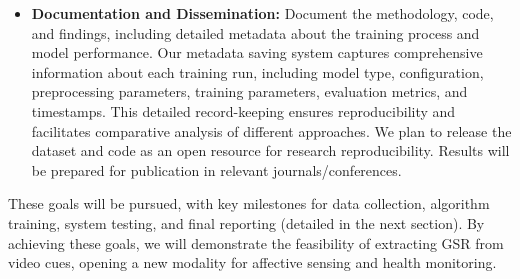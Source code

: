 \begin{itemize}
        \item \textbf{Documentation and Dissemination:} Document the methodology, code, and findings, including detailed metadata about the training process and model performance. Our metadata saving system captures comprehensive information about each training run, including model type, configuration, preprocessing parameters, training parameters, evaluation metrics, and timestamps. This detailed record-keeping ensures reproducibility and facilitates comparative analysis of different approaches. We plan to release the dataset and code as an open resource for research reproducibility. Results will be prepared for publication in relevant journals/conferences.
    \end{itemize}

    These goals will be pursued, with key milestones for data collection, algorithm training, system testing, and final reporting (detailed in the next section). By achieving these goals, we will demonstrate the feasibility of extracting GSR from video cues, opening a new modality for affective sensing and health monitoring.


